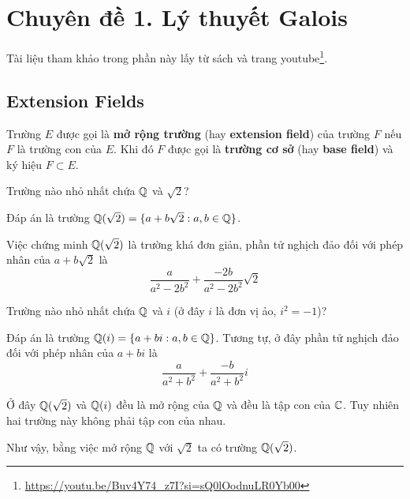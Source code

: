\chapter*{Chuyên đề 1. Lý thuyết Galois}

Tài liệu tham khảo trong phần này lấy từ sách \cite{Judson2012} và trang youtube\footnote{\url{https://youtu.be/Buv4Y74_z7I?si=sQ0lOodnuLR0Yb00}}.

\section{Extension Fields}

\begin{definition}
    Trường $E$ được gọi là \textbf{mở rộng trường} (hay \textbf{extension field}) của trường $F$ nếu $F$ là trường con của $E$. Khi đó $F$ được gọi là \textbf{trường cơ sở} (hay \textbf{base field}) và ký hiệu $F \subset E$.
\end{definition}

\begin{example}
    Trường nào nhỏ nhất chứa $\mathbb{Q}$ và $\sqrt{2}$?

    Đáp án là trường $\mathbb{Q}(\sqrt{2}) = \{ a + b \sqrt{2} : a, b \in \mathbb{Q} \}$.

    Việc chứng minh $\mathbb{Q}(\sqrt{2})$ là trường khá đơn giản, phần tử nghịch đảo đối với phép nhân của $a + b \sqrt{2}$ là
    \begin{equation*}
        \frac{a}{a^2 - 2 b^2} + \frac{-2b}{a^2 - 2 b^2} \sqrt{2}
    \end{equation*}
\end{example}

\begin{example}
    Trường nào nhỏ nhất chứa $\mathbb{Q}$ và $i$ (ở đây $i$ là đơn vị ảo, $i^2 = -1$)?

    Đáp án là trường $\mathbb{Q}(i) = \{ a + b i : a, b \in \mathbb{Q} \}$. Tương tự, ở đây phần tử nghịch đảo đối với phép nhân của $a + b i$ là
    \begin{equation*}
        \frac{a}{a^2 + b^2} + \frac{-b}{a^2 + b^2} i
    \end{equation*}
\end{example}

Ở đây $\mathbb{Q}(\sqrt{2})$ và $\mathbb{Q}(i)$ đều là mở rộng của $\mathbb{Q}$ và đều là tập con của $\mathbb{C}$. Tuy nhiên hai trường này không phải tập con của nhau.

Như vậy, bằng việc mở rộng $\mathbb{Q}$ với $\sqrt{2}$ ta có trường $\mathbb{Q}(\sqrt{2})$.

